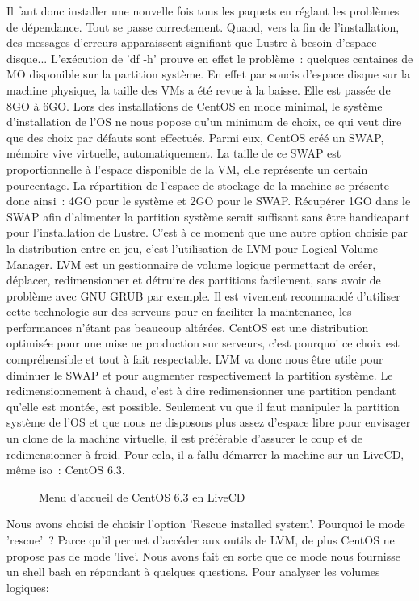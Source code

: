 \documentclass[12pt]{article}
\begin{document}
Il faut donc installer une nouvelle fois tous les paquets en réglant les problèmes de dépendance. Tout se passe correctement. Quand, vers la fin de l'installation, des messages d'erreurs apparaissent signifiant que Lustre à besoin d'espace disque... L’exécution de 'df -h' prouve en effet le problème : quelques centaines de MO disponible sur la partition système. En effet par soucis d'espace disque sur la machine physique, la taille des VMs a été revue à la baisse. Elle est passée de 8GO à 6GO. Lors des installations de CentOS en mode minimal, le système d'installation de l'OS ne nous popose qu'un minimum de choix, ce qui veut dire que des choix par défauts sont effectués. Parmi eux, CentOS créé un SWAP, mémoire vive virtuelle, automatiquement. La taille de ce SWAP est proportionnelle à l'espace disponible de la VM, elle représente un certain pourcentage. La répartition de l'espace de stockage de la machine se présente donc ainsi : 4GO pour le système et 2GO pour le SWAP. Récupérer 1GO dans le SWAP afin d'alimenter la partition système serait suffisant sans être handicapant pour l'installation de Lustre. C'est à ce moment que une autre option choisie par la distribution entre en jeu, c'est l'utilisation de LVM pour Logical Volume Manager. LVM est un gestionnaire de volume logique permettant de créer, déplacer, redimensionner et détruire des partitions facilement, sans avoir de problème avec GNU GRUB par exemple. Il est vivement recommandé d'utiliser cette technologie sur des serveurs pour en faciliter la maintenance, les performances n'étant pas beaucoup altérées. CentOS est une distribution optimisée pour une mise ne production sur serveurs, c'est pourquoi ce choix est compréhensible et tout à fait respectable. LVM va donc nous être utile pour diminuer le SWAP et pour augmenter respectivement la partition système. Le redimensionnement à chaud, c'est à dire redimensionner une partition pendant qu'elle est montée, est possible. Seulement vu que il faut manipuler la partition système de l'OS et que nous ne disposons plus assez d'espace libre pour envisager un clone de la machine virtuelle, il est préférable d'assurer le coup et de redimensionner à froid. Pour cela, il a fallu démarrer la machine sur un LiveCD, même iso : CentOS 6.3.

\begin{figure}[H]
\caption{Menu d'accueil de CentOS 6.3 en LiveCD}
\label{fig:identification}
\end{figure}

Nous avons choisi de choisir l'option 'Rescue installed system'. Pourquoi le mode 'rescue' ? Parce qu'il permet d'accéder aux outils de LVM, de plus CentOS ne propose pas de mode 'live'. Nous avons fait en sorte que ce mode nous fournisse un shell bash en répondant à quelques questions. Pour analyser les volumes logiques:
\end{document}
